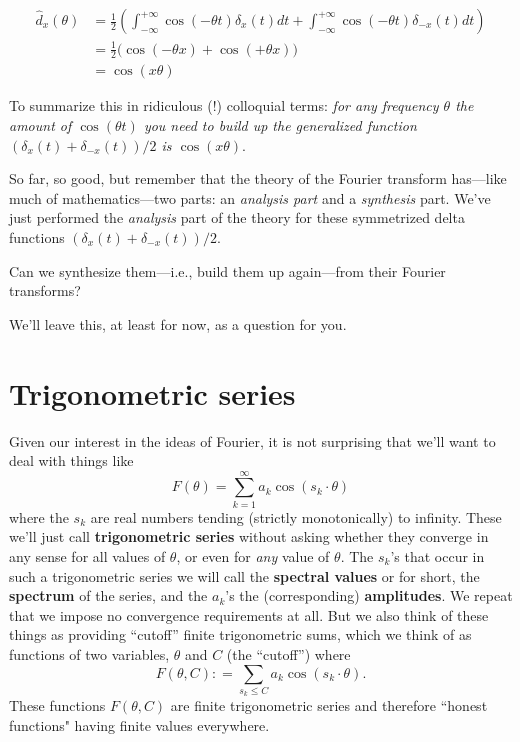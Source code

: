 \documentclass[openany]{book}
\theoremstyle{plain}
\theoremstyle{definition}
\begin{document}
\begin{align*}\label{dx}
{\hat d_x}(\theta)  &=  {\frac{1}{2}}\left(\int_{-\infty}^{+\infty}\cos(-\theta t)\delta_x(t)dt + \int_{-\infty}^{+\infty}\cos(-\theta t)\delta_{-x}(t)dt\right)\\
    &= {\frac{1}{2}}\big(\cos(-\theta x)+ \cos(+\theta x)\big)\\
    &= \cos(x\theta)
\end{align*}


To summarize this in ridiculous (!) colloquial terms: {\it for any
  frequency $\theta$ the amount of $\cos(\theta t)$ you need to build
  up the generalized function $(\delta_x(t) + \delta_{-x}(t))/2$ is
  $\cos(x\theta).$ }


So far, so good, but remember that the theory of the Fourier transform
has---like much of mathematics---two parts: an {\it analysis part} and
a {\it synthesis} part.  We've just performed the {\it analysis} part
of the theory for these symmetrized delta functions $(\delta_x(t) +
\delta_{-x}(t))/2$.

Can we synthesize them---i.e., build them up again---from their Fourier transforms?


  We'll leave this, at least for now, as a question for you.




\chapter{Trigonometric series}\label{ch:trigseries}
Given our interest in the ideas of Fourier, it is not surprising that
we'll want to deal with things like $$F(\theta) = \sum_{k=1}^{\infty}
a_k\cos(s_k\cdot \theta)$$ where the $s_k$ are real numbers tending
(strictly monotonically) to infinity.  These we'll just call {\bf
  trigonometric series} without asking whether they converge in any
sense for all values of $\theta$, or even for {\it any} value of $\theta$. The
$s_k$'s that occur in such a trigonometric series we will call the
{\bf spectral values} or for short, the {\bf spectrum} of the series,
and the $a_k$'s the (corresponding) {\bf amplitudes}.  We repeat that
we impose no convergence requirements at all. But we also think of
these things as providing ``cutoff'' finite trigonometric sums, which
we think of as functions of two variables, $\theta$ and $C$ (the
``cutoff'') where $$F(\theta,C): = \sum_{s_k\le C} a_k\cos(s_k\cdot \theta).$$ These functions $F(\theta,C)$ are finite trigonometric series and therefore ``honest functions" having finite values everywhere.
\end{document}
